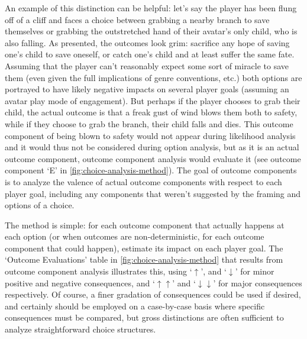 An example of this distinction can be helpful: let's say the player has been flung off of a cliff and faces a choice between grabbing a nearby branch to save themselves or grabbing the outstretched hand of their avatar's only child, who is also falling.
%
As presented, the outcomes look grim: sacrifice any hope of saving one's child to save oneself, or catch one's child and at least suffer the same fate.
%
Assuming that the player can't reasonably expect some sort of miracle to save them (even given the full implications of genre conventions, etc.) both options are portrayed to have likely negative impacts on several player goals (assuming an avatar play mode of engagement).
%
But perhaps if the player chooses to grab their child, the actual outcome is that a freak gust of wind blows them both to safety, while if they choose to grab the branch, their child falls and dies.
%
This outcome component of being blown to safety would not appear during likelihood analysis and it would thus not be considered during option analysis, but as it is an actual outcome component, outcome component analysis would evaluate it (see outcome component `E' in \cref{fig:choice-analysis-method}).
%
The goal of outcome components is to analyze the valence of actual outcome components with respect to each player goal, including any components that weren't suggested by the framing and options of a choice.


The method is simple: for each outcome component that actually happens at each option (or when outcomes are non-deterministic, for each outcome component that could happen), estimate its impact on each player goal.
%
The `Outcome Evaluations' table in \cref{fig:choice-analysis-method} that results from outcome component analysis illustrates this, using `$\uparrow$', and `$\downarrow$' for minor positive and negative consequences, and `$\uparrow\uparrow$' and `$\downarrow\downarrow$' for major consequences respectively.
%
Of course, a finer gradation of consequences could be used if desired, and certainly should be employed on a case-by-case basis where specific consequences must be compared, but gross distinctions are often sufficient to analyze straightforward choice structures.


